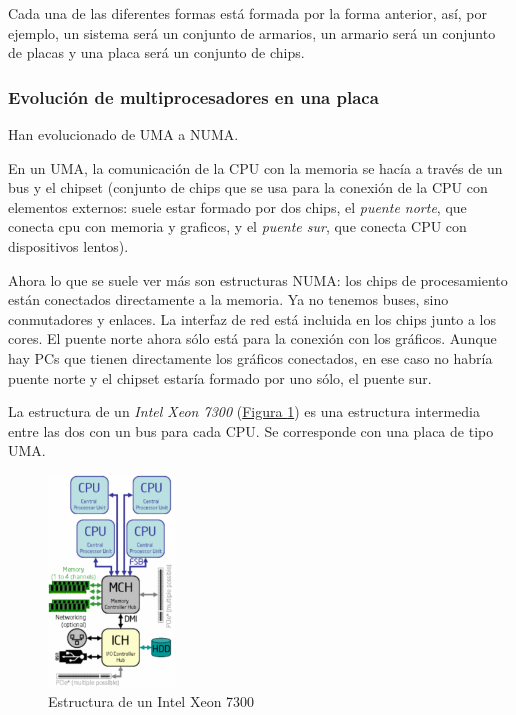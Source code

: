 \documentclass[10pt,a4paper,spanish]{report}
\begin{document}
\begin{center}

\end{center}

Cada una de las diferentes formas está formada por la forma anterior, así, por ejemplo, un sistema será un conjunto de armarios, un armario será un conjunto de placas y una placa será un conjunto de chips.

\textcolor[rgb]{0.2,0.4,0.8}{\subsubsection{Evolución de multiprocesadores en una placa}}
Han evolucionado de UMA a NUMA. 

En un UMA, la comunicación de la CPU con la memoria se hacía a través de un bus y el chipset (conjunto de chips que se usa para la conexión de la CPU con elementos externos: suele estar formado por dos chips, el \textit{\textcolor[rgb]{0.2,0.4,0.8}{puente norte}}, que conecta cpu con memoria y graficos, y el \textit{\textcolor[rgb]{0.2,0.4,0.8}{puente sur}}, que conecta CPU con dispositivos lentos).

Ahora lo que se suele ver más son estructuras NUMA: los chips de procesamiento están conectados directamente a la memoria. Ya no tenemos buses, sino conmutadores y enlaces. La interfaz de red está incluida en los chips junto a los cores. El puente norte ahora sólo está para la conexión con los gráficos. Aunque hay PCs que tienen directamente los gráficos conectados, en ese caso no habría puente norte y el chipset estaría formado por uno sólo, el puente sur.


La estructura de un \textcolor[rgb]{0.2,0.4,0.8}{\textit{Intel Xeon 7300}} (\hyperref[intel_7300]{Figura \ref*{intel_7300}}) es una estructura intermedia entre las dos con un bus para cada CPU. Se corresponde con una placa de tipo UMA.

\begin{figure}[!h]
\centering
\includegraphics[width=0.3\textwidth]{53}
\caption{Estructura de un Intel Xeon 7300}
\label{intel_7300}
\end{figure}
\end{document}
